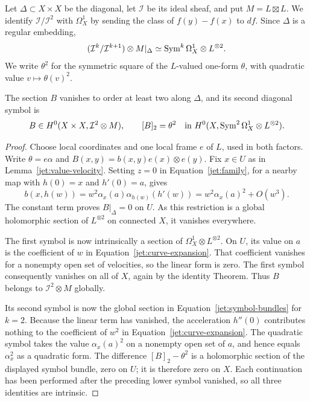 Let $\Delta\subset X\times X$ be the diagonal, let $\mathcal I$
be its ideal sheaf, and put $M=L\boxtimes L$. We identify
$\mathcal I/\mathcal I^2$ with $\Omega_X^1$ by sending the class of
$f(y)-f(x)$ to $df$. Since $\Delta$ is a regular embedding,
\begin{equation}\label{jet:symbol-bundles}
(\mathcal I^k/\mathcal I^{k+1})\otimes M|_\Delta
\simeq\operatorname{Sym}^k\Omega_X^1\otimes L^{\otimes2}.
\end{equation}
We write $\theta^2$ for the symmetric square of the $L$-valued
one-form $\theta$, with quadratic value $v\mapsto\theta(v)^2$.

\begin{proposition}\label{jet:diagonal}
The section $B$ vanishes to order at least two along $\Delta$, and
its second diagonal symbol is
\begin{equation}\label{jet:second-symbol}
B\in H^0(X\times X,\mathcal I^2\otimes M),
\qquad [B]_2=\theta^2
\quad\text{in }H^0(X,\operatorname{Sym}^2\Omega_X^1\otimes L^{\otimes2}).
\end{equation}
\end{proposition}

\begin{proof}
Choose local coordinates and one local frame $e$ of $L$, used in
both factors. Write $\theta=e\alpha$ and
$B(x,y)=b(x,y)e(x)\otimes e(y)$. Fix $x\in U$ as in
Lemma~\ref{jet:value-velocity}. Setting $z=0$ in
Equation~\eqref{jet:family}, for a nearby map with
$h(0)=x$ and $h'(0)=a$, gives
\begin{equation}\label{jet:curve-expansion}
b(x,h(w))
=w^2\alpha_x(a)\alpha_{h(w)}(h'(w))
=w^2\alpha_x(a)^2+O(w^3).
\end{equation}
The constant term proves $B|_\Delta=0$ on $U$. As this restriction
is a global holomorphic section of $L^{\otimes2}$ on connected
$X$, it vanishes everywhere.

The first symbol is now intrinsically a section of
$\Omega_X^1\otimes L^{\otimes2}$. On $U$, its value on $a$ is
the coefficient of $w$ in Equation~\eqref{jet:curve-expansion}.
That coefficient vanishes for a nonempty open set of velocities,
so the linear form is zero. The first symbol consequently
vanishes on all of $X$, again by the identity Theorem. Thus
$B$ belongs to $\mathcal I^2\otimes M$ globally.

Its second symbol is now the global section in
Equation~\eqref{jet:symbol-bundles} for $k=2$. Because the linear
term has vanished, the acceleration $h''(0)$ contributes nothing
to the coefficient of $w^2$ in Equation~\eqref{jet:curve-expansion}.
The quadratic symbol takes the value $\alpha_x(a)^2$ on a nonempty
open set of $a$, and hence equals $\alpha_x^2$ as a quadratic form.
The difference $[B]_2-\theta^2$ is a holomorphic section of the
displayed symbol bundle, zero on $U$; it is therefore zero on $X$.
Each continuation has been performed after the preceding lower
symbol vanished, so all three identities are intrinsic.
\end{proof}

